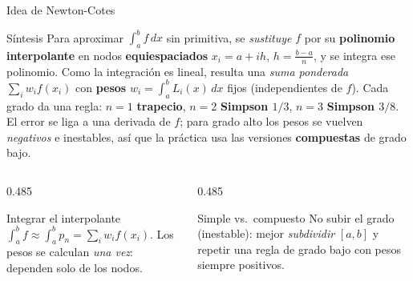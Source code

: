 \documentclass[aspectratio=169,10pt]{beamer}
\begin{document}
\begin{frame}{Idea de Newton-Cotes}
\begin{cardidea}{Síntesis}{\faLightbulb}
Para aproximar $\int_a^b f\,dx$ sin primitiva, se \emph{sustituye} $f$ por su \textbf{polinomio interpolante} en nodos \textbf{equiespaciados} $x_i=a+ih$, $h=\tfrac{b-a}{n}$, y se integra ese polinomio. Como la integración es lineal, resulta una \emph{suma ponderada} $\sum_i w_i f(x_i)$ con \textbf{pesos} $w_i=\int_a^b L_i(x)\,dx$ fijos (independientes de $f$). Cada grado da una regla: $n{=}1$ \textbf{trapecio}, $n{=}2$ \textbf{Simpson $1/3$}, $n{=}3$ \textbf{Simpson $3/8$}. El error se liga a una derivada de $f$; para grado alto los pesos se vuelven \emph{negativos} e inestables, así que la práctica usa las versiones \textbf{compuestas} de grado bajo.
\end{cardidea}
\vspace{2mm}
\begin{columns}[T]
\begin{column}{0.485\textwidth}
\begin{cardgear}{Integrar el interpolante}{\faCogs}
$\displaystyle\int_a^b f\approx\int_a^b p_n=\sum_i w_i f(x_i)$. Los pesos se calculan \emph{una vez}: dependen solo de los nodos.
\end{cardgear}
\end{column}
\begin{column}{0.485\textwidth}
\begin{cardgear}{Simple vs.\ compuesto}{\faCogs}
No subir el grado (inestable): mejor \emph{subdividir} $[a,b]$ y repetir una regla de grado bajo con pesos siempre positivos.
\end{cardgear}
\end{column}
\end{columns}
\end{frame}
\end{document}
